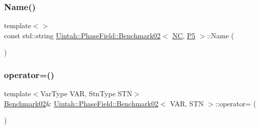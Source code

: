 \mbox{\label{classUintah_1_1PhaseField_1_1Benchmark02_aeba1af4c807d2e6d6bc8c678a40fa92c}} 
\subsubsection{\texorpdfstring{Name()}{Name()}\hspace{0.1cm}{\footnotesize\ttfamily [2/2]}}
{\footnotesize\ttfamily template$<$$>$ \\
const std\+::string \hyperlink{classUintah_1_1PhaseField_1_1Benchmark02}{Uintah\+::\+Phase\+Field\+::\+Benchmark02}$<$ \hyperlink{namespaceUintah_1_1PhaseField_a33d355affda78a83f45755ba8388cedda77924170fe82bfd58b74ca3e44139718}{NC}, \hyperlink{namespaceUintah_1_1PhaseField_a24d833a720598df1020f5cc2e75f8702a218e7fca21085b602c79158a04bc83a0}{P5} $>$\+::Name (\begin{DoxyParamCaption}{ }\end{DoxyParamCaption})}

\mbox{\label{classUintah_1_1PhaseField_1_1Benchmark02_a53bd0c07c069db978fd2e993e451ead8}} 
\subsubsection{\texorpdfstring{operator=()}{operator=()}}
{\footnotesize\ttfamily template$<$Var\+Type V\+AR, Stn\+Type S\+TN$>$ \\
\hyperlink{classUintah_1_1PhaseField_1_1Benchmark02}{Benchmark02}\& \hyperlink{classUintah_1_1PhaseField_1_1Benchmark02}{Uintah\+::\+Phase\+Field\+::\+Benchmark02}$<$ V\+AR, S\+TN $>$\+::operator= (\begin{DoxyParamCaption}\item[{\hyperlink{classUintah_1_1PhaseField_1_1Benchmark02}{Benchmark02}$<$ V\+AR, S\+TN $>$ const \&}]{ }\end{DoxyParamCaption})\hspace{0.3cm}{\ttfamily [delete]}}



